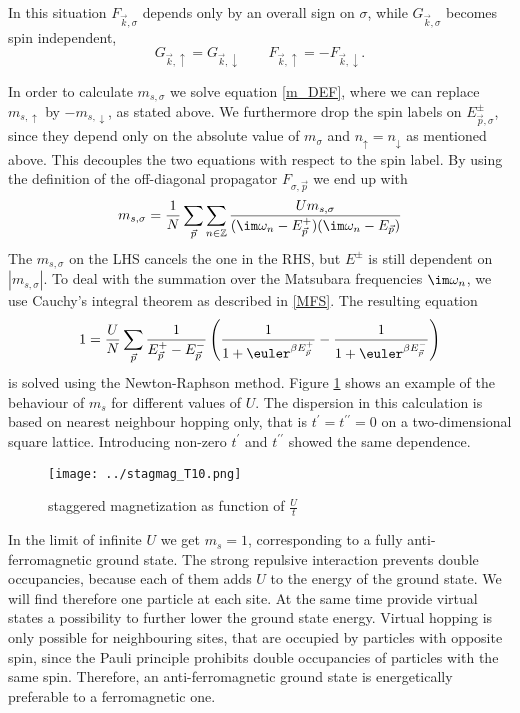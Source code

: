 \documentclass[a4paper,12pt]{report}
\begin{document}
In this situation $F_{\vec k,\sigma}$ depends only by an overall sign on $\sigma$, while $G_{\vec k,\sigma}$ becomes spin independent,
\begin{equation}
 G_{\vec k,\uparrow} = G_{\vec k,\downarrow} \qquad F_{\vec k,\uparrow} =-F_{\vec k,\downarrow}.
\end{equation}




In order to calculate $m_ {s,\sigma}$ we solve equation \ref{m_DEF}, where we can replace $m_{s,\uparrow}$ by $-m_{s,\downarrow}$, as stated above.
We furthermore drop the spin labels on $E_{\vec p,\sigma}^{\pm}$, 
since they depend only on the absolute value of $m_{\sigma}$ and $n_{\uparrow} = n_{\downarrow}$ as mentioned above.
This decouples the two equations with respect to the spin label.
By using the definition of the off-diagonal propagator $F_{\sigma,\vec{p}}$ we end up with
\begin{equation}
 m_{s,\sigma} = \frac1N \sum_{\vec{p}} \sum_{n\in \mathbb{Z}} 
							      \frac { Um_{s,\sigma} }
								    { (\im \omega_n - E_{\vec{p}}^+) (\im \omega_n - E_{\vec{p}})}
\end{equation}
The $m_{s,\sigma}$ on the LHS cancels the one in the RHS, but $E^{\pm}$ is still dependent on $|m_{s,\sigma}|$.
To deal with the summation over the Matsubara frequencies $\im \omega_n$, we use Cauchy's integral theorem as described in \ref{MFS}.
The resulting equation
\begin{equation}
 1= \frac{U}{N}\sum_{\vec{p}} \frac{1}{E_{\vec p}^+ - E_{\vec{p}}^-} \left( \frac{1}{1+\euler^{\beta E_{\vec p}^+}} - \frac{1}{1+\euler^{\beta E_{\vec p}^-}} \right)
\end{equation}
is solved using the Newton-Raphson method.
Figure \ref{ms_nn} shows an example of the behaviour of $m_s$ for different values of $U$. The dispersion in this calculation is based 
on nearest neighbour hopping only, that is $t^{\prime} = t^{\prime \prime} = 0$ on a two-dimensional square lattice.
Introducing non-zero $t^{\prime}$ and $t^{\prime \prime}$ showed the same dependence. 
%
%
\begin{figure}
 \label{ms_nn}
 \texttt{[image: ../stagmag\_T10.png]}
 \caption{staggered magnetization as function of $\frac Ut$}
 
\end{figure}
%
In the limit of infinite $U$ we get $m_s=1$, corresponding to a fully anti-ferromagnetic ground state. 
The strong repulsive interaction prevents double occupancies, because each of them adds $U$ to the energy of the ground state.
We will find therefore one particle at each site.
At the same time provide virtual states a possibility to further lower the ground state energy.
Virtual hopping is only possible for neighbouring sites, that are occupied by particles with opposite spin,
since the Pauli principle prohibits double occupancies of particles with the same spin.
Therefore, an anti-ferromagnetic ground state is energetically preferable to a ferromagnetic one.
\end{document}
